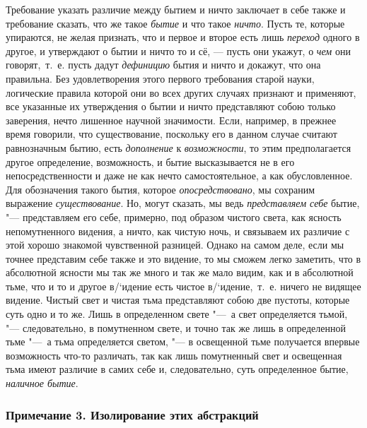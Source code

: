Требование указать различие между бытием и ничто заключает в себе также и
требование сказать, что же такое {\em бытие} и что
такое {\em ничто}. Пусть те, которые упираются, не
желая признать, что и первое и второе есть лишь
{\em переход} одного в другое, и утверждают о бытии и
ничто то и сё, --- пусть они укажут, о {\em чем} они
говорят,~т.~е. пусть дадут {\em дефиницию} бытия и
ничто и докажут, что она правильна. Без удовлетворения этого первого
требования старой науки, логические правила которой они во всех других
случаях признают и применяют, все указанные их утверждения о бытии и ничто
представляют собою только заверения, нечто лишенное научной значимости.
Если, например, в прежнее время говорили, что существование, поскольку его
в данном случае считают равнозначным бытию, есть
{\em дополнение} к
{\em возможности}, то этим предполагается другое
определение, возможность, и бытие высказывается не в его непосредственности
и даже не как нечто самостоятельное, а как обусловленное. Для обозначения
такого бытия, которое {\em опосредствовано}, мы
сохраним выражение {\em существование}. Но, могут
сказать, мы ведь {\em представляем себе} бытие, "---
представляем его себе, примерно, под образом чистого света, как ясность
непомутненного видения, а ничто, как чистую ночь, и связываем их различие с
этой хорошо знакомой чувственной разницей. Однако на самом деле, если мы
точнее представим себе также и это видение, то мы сможем легко заметить,
что в абсолютной ясности мы так же много и так же мало видим, как и в
абсолютной тьме, что и то и другое в/`{и}дение есть чистое в/`{и}дение,~т.~е.
ничего не видящее видение. Чистый свет и чистая тьма представляют собою две
пустоты, которые суть одно и то же. Лишь в определенном свете "---~а свет
определяется тьмой, "--- следовательно, в помутненном свете, и точно так же
лишь в определенной тьме "---~а тьма определяется светом, "--- в освещенной тьме
получается впервые возможность что-то различать, так как лишь помутненный
свет и освещенная тьма имеют различие в самих себе и, следовательно, суть
определенное бытие, {\em наличное бытие}.


\subsubsection[Примечание 3. Изолирование этих абстракций]
{Примечание 3. Изолирование этих абстракций}

